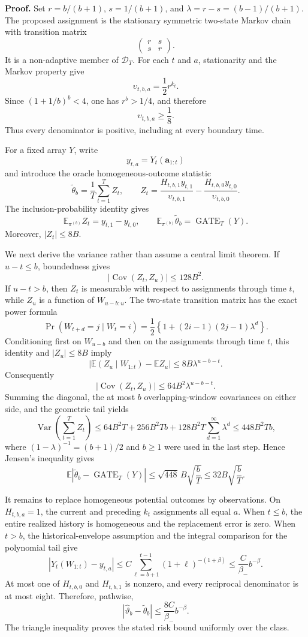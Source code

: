 \textbf{Proof.} Set \(r=b/(b+1)\), \(s=1/(b+1)\), and \(\lambda=r-s=(b-1)/(b+1)\). The proposed assignment is the stationary symmetric two-state Markov chain with transition matrix
\[
\begin{pmatrix}r&s\\s&r\end{pmatrix}.
\]
It is a non-adaptive member of \(\mathcal D_T\). For each \(t\) and \(a\), stationarity and the Markov property give
\[
\upsilon_{t,b,a}=\frac12r^{k_t}.
\]
Since \((1+1/b)^b<4\), one has \(r^b>1/4\), and therefore
\[
\upsilon_{t,b,a}\ge\frac18.
\]
Thus every denominator is positive, including at every boundary time.

For a fixed array \(Y\), write
\[
y_{t,a}=Y_t(\mathbf a_{1:t})
\]
and introduce the oracle homogeneous-outcome statistic
\[
\widetilde\theta_b
=\frac1T\sum_{t=1}^TZ_t,
\qquad
Z_t=\frac{H_{t,b,1}y_{t,1}}{\upsilon_{t,b,1}}
-\frac{H_{t,b,0}y_{t,0}}{\upsilon_{t,b,0}}.
\]
The inclusion-probability identity gives
\[
\mathbb E_{\pi^{(b)}}Z_t=y_{t,1}-y_{t,0},
\qquad
\mathbb E_{\pi^{(b)}}\widetilde\theta_b
=\operatorname{GATE}_T(Y).
\]
Moreover, \(|Z_t|\le8B\).

We next derive the variance rather than assume a central limit theorem. If \(u-t\le b\), boundedness gives
\[
|\operatorname{Cov}(Z_t,Z_u)|\le128B^2.
\]
If \(u-t>b\), then \(Z_t\) is measurable with respect to assignments through time \(t\), while \(Z_u\) is a function of \(W_{u-b:u}\). The two-state transition matrix has the exact power formula
\[
\Pr(W_{t+d}=j\mid W_t=i)
=\frac12\left\{1+(2i-1)(2j-1)\lambda^d\right\}.
\]
Conditioning first on \(W_{u-b}\) and then on the assignments through time \(t\), this identity and \(|Z_u|\le8B\) imply
\[
\left|\mathbb E(Z_u\mid W_{1:t})-\mathbb EZ_u\right|
\le8B\lambda^{u-b-t}.
\]
Consequently
\[
|\operatorname{Cov}(Z_t,Z_u)|
\le64B^2\lambda^{u-b-t}.
\]
Summing the diagonal, the at most \(b\) overlapping-window covariances on either side, and the geometric tail yields
\[
\operatorname{Var}\left(\sum_{t=1}^TZ_t\right)
\le64B^2T+256B^2Tb
+128B^2T\sum_{d=1}^{\infty}\lambda^d
\le448B^2Tb,
\]
where \((1-\lambda)^{-1}=(b+1)/2\) and \(b\ge1\) were used in the last step. Hence Jensen's inequality gives
\[
\mathbb E\left|\widetilde\theta_b-\operatorname{GATE}_T(Y)\right|
\le \sqrt{448}\,B\sqrt{\frac bT}
\le32B\sqrt{\frac bT}.
\]

It remains to replace homogeneous potential outcomes by observations. On \(H_{t,b,a}=1\), the current and preceding \(k_t\) assignments all equal \(a\). When \(t\le b\), the entire realized history is homogeneous and the replacement error is zero. When \(t>b\), the historical-envelope assumption and the integral comparison for the polynomial tail give
\[
|Y_t(W_{1:t})-y_{t,a}|
\le C\sum_{\ell=b+1}^{t-1}(1+\ell)^{-(1+\beta)}
\le\frac{C}{\beta_-}b^{-\beta}.
\]
At most one of \(H_{t,b,0}\) and \(H_{t,b,1}\) is nonzero, and every reciprocal denominator is at most eight. Therefore, pathwise,
\[
|\widehat\vartheta_b-\widetilde\theta_b|
\le\frac{8C}{\beta_-}b^{-\beta}.
\]
The triangle inequality proves the stated risk bound uniformly over the class.

